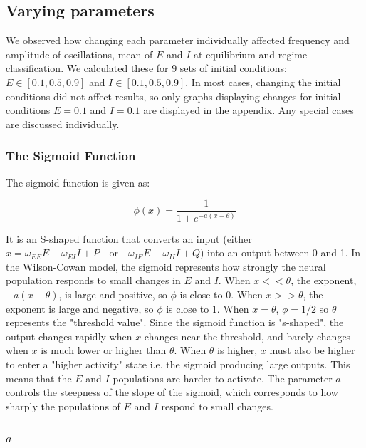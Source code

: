 \documentclass[10pt]{article}
\begin{document}
\begin{flushleft}
\subsection{Varying parameters}

We observed how changing each parameter individually affected frequency and amplitude of oscillations, mean of $E$ and $I$ at equilibrium and regime classification. We calculated these for 9 sets of initial conditions: $E \in [0.1,0.5,0.9]$ and $I \in [0.1,0.5,0.9]$. In most cases, changing the initial conditions did not affect results, so only graphs displaying changes for initial conditions $E=0.1$ and $I=0.1$ are displayed in the appendix. Any special cases are discussed individually.

\subsubsection{The Sigmoid Function}

The sigmoid function is given as:

\[
\phi (x) = \frac{1}{1+e^{-a(x-\theta)}}
\]

It is an S-shaped function that converts an input (either $x = \omega_{EE}E - \omega_{EI}I + P \quad \text{or} \quad \omega_{IE}E - \omega_{II}I + Q$)
into an output between 0 and 1. In the Wilson-Cowan model, the sigmoid represents how strongly the neural population responds to small changes in $E$ and $I$.
\newline
When $x << \theta$, the exponent, $-a(x -\theta)$, is large and positive, so $\phi$ is close to 0. When $x>> \theta$, the exponent is large and negative, so $\phi$ is close to 1. When $x=\theta$, $\phi = 1/2$ so $\theta$ represents the "threshold value". Since the sigmoid function is "s-shaped", the output changes rapidly when $x$ changes near the threshold, and barely changes when $x$ is much lower or higher than $\theta$. When $\theta$ is higher, $x$ must also be higher to enter a "higher activity" state i.e. the sigmoid producing large outputs. This means that the $E$ and $I$ populations are harder to activate. The parameter $a$ controls the steepness of the slope of the sigmoid, which corresponds to how sharply the populations of $E$ and $I$ respond to small changes.

\subsubsection{$a$}


\end{flushleft}
\end{document}

